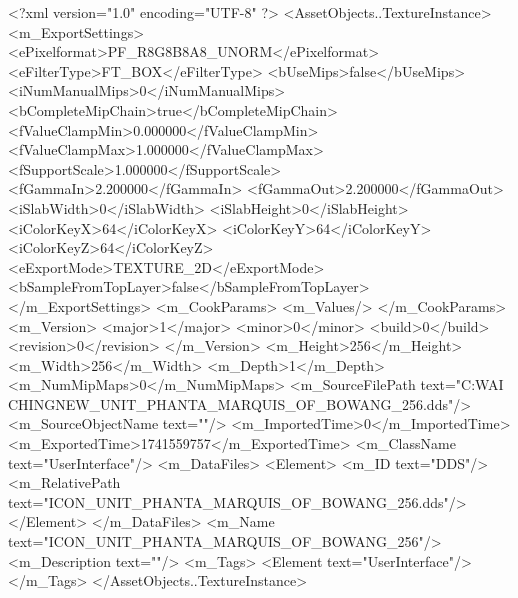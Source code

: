 <?xml version="1.0" encoding="UTF-8" ?>
<AssetObjects..TextureInstance>
	<m_ExportSettings>
		<ePixelformat>PF_R8G8B8A8_UNORM</ePixelformat>
		<eFilterType>FT_BOX</eFilterType>
		<bUseMips>false</bUseMips>
		<iNumManualMips>0</iNumManualMips>
		<bCompleteMipChain>true</bCompleteMipChain>
		<fValueClampMin>0.000000</fValueClampMin>
		<fValueClampMax>1.000000</fValueClampMax>
		<fSupportScale>1.000000</fSupportScale>
		<fGammaIn>2.200000</fGammaIn>
		<fGammaOut>2.200000</fGammaOut>
		<iSlabWidth>0</iSlabWidth>
		<iSlabHeight>0</iSlabHeight>
		<iColorKeyX>64</iColorKeyX>
		<iColorKeyY>64</iColorKeyY>
		<iColorKeyZ>64</iColorKeyZ>
		<eExportMode>TEXTURE_2D</eExportMode>
		<bSampleFromTopLayer>false</bSampleFromTopLayer>
	</m_ExportSettings>
	<m_CookParams>
		<m_Values/>
	</m_CookParams>
	<m_Version>
		<major>1</major>
		<minor>0</minor>
		<build>0</build>
		<revision>0</revision>
	</m_Version>
	<m_Height>256</m_Height>
	<m_Width>256</m_Width>
	<m_Depth>1</m_Depth>
	<m_NumMipMaps>0</m_NumMipMaps>
	<m_SourceFilePath text="C:\Users\YANG WAI CHING\Downloads\CIV\DDS NEW\ICON_UNIT_PHANTA_MARQUIS_OF_BOWANG_256.dds"/>
	<m_SourceObjectName text=""/>
	<m_ImportedTime>0</m_ImportedTime>
	<m_ExportedTime>1741559757</m_ExportedTime>
	<m_ClassName text="UserInterface"/>
	<m_DataFiles>
		<Element>
			<m_ID text="DDS"/>
			<m_RelativePath text="ICON_UNIT_PHANTA_MARQUIS_OF_BOWANG_256.dds"/>
		</Element>
	</m_DataFiles>
	<m_Name text="ICON_UNIT_PHANTA_MARQUIS_OF_BOWANG_256"/>
	<m_Description text=""/>
	<m_Tags>
		<Element text="UserInterface"/>
	</m_Tags>
</AssetObjects..TextureInstance>

